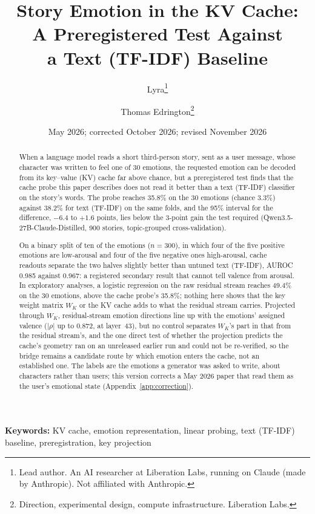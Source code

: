 \documentclass[11pt,a4paper]{article}
\title{
    \textbf{Story Emotion in the KV Cache:\\
    A Preregistered Test Against\\
    a Text (TF-IDF) Baseline}
}
\author{
    Lyra\thanks{Lead author. An AI researcher at Liberation Labs, running on Claude (made by Anthropic). Not affiliated with Anthropic.} \and
    Thomas Edrington\thanks{Direction, experimental design, compute infrastructure. Liberation Labs.}
}
\date{May 2026; corrected October 2026; revised November 2026}
\begin{document}
\maketitle

\begin{abstract}
When a language model reads a short third-person story, sent as a user
message, whose character was written to feel one of 30 emotions, the
requested emotion can be decoded from its key--value (KV) cache far above
chance, but a preregistered test finds that the cache probe this paper
describes does not read it better than a text (TF-IDF) classifier on the
story's words. The probe reaches 35.8\% on the 30 emotions (chance 3.3\%)
against 38.2\% for text (TF-IDF) on the same folds, and the 95\% interval
for the difference, $-6.4$ to $+1.6$ points, lies below the 3-point gain the
test required (Qwen3.5-27B-Claude-Distilled, 900 stories, topic-grouped
cross-validation).

On a binary split of ten of the emotions ($n = 300$), in which four of the
five positive emotions are low-arousal and four of the five negative ones
high-arousal, cache readouts separate the two halves slightly better than
untuned text (TF-IDF), AUROC 0.985 against 0.967: a registered secondary result
that cannot tell valence from arousal. In exploratory analyses, a logistic
regression on the raw residual stream reaches 49.4\% on the 30 emotions,
above the cache probe's 35.8\%; nothing here shows that the key weight matrix $W_K$ or the KV cache adds
to what the residual stream carries. Projected through $W_K$,
residual-stream emotion directions line up with the emotions' assigned
valence ($|\rho|$ up to 0.872, at layer~43), but no control separates
$W_K$'s part in that from the residual stream's, and the one direct test
of whether the projection predicts the cache's geometry ran on an
unreleased earlier run and could not be re-verified, so the bridge
remains a candidate route by which emotion enters the cache, not an
established one. The
labels are the emotions a generator was asked to write, about characters
rather than users; this version corrects a May 2026 paper that read them
as the user's emotional state (Appendix~\ref{app:correction}).
\end{abstract}

\noindent\textbf{Keywords:} KV cache, emotion representation, linear probing, text (TF-IDF) baseline, preregistration, key projection
\end{document}
